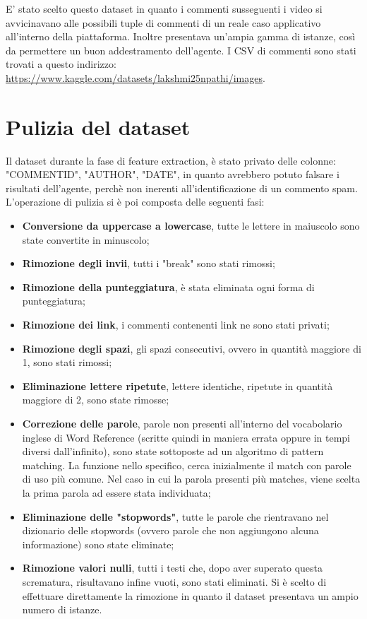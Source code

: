 \documentclass{report}
\begin{document}
    E' stato scelto questo dataset in quanto i commenti susseguenti i video si avvicinavano alle possibili tuple di commenti
    di un reale caso applicativo all'interno della piattaforma.
    Inoltre presentava un'ampia gamma di istanze, così da permettere un buon addestramento dell'agente.
    I CSV di commenti sono stati trovati a questo indirizzo: \newline 
    \href{https://www.kaggle.com/datasets/lakshmi25npathi/images}{https://www.kaggle.com/datasets/lakshmi25npathi/images}.
    
    \section{Pulizia del dataset}
    Il dataset durante la fase di feature extraction, 
    è stato privato delle colonne: "COMMENT\textunderscore ID", "AUTHOR", "DATE", in quanto avrebbero potuto falsare i risultati dell'agente, 
    perchè non inerenti all'identificazione di un commento spam.
    L'operazione di pulizia si è poi composta delle seguenti fasi: 

    \begin{itemize}
        \item {\bfseries Conversione da uppercase a lowercase}, tutte le lettere in maiuscolo sono state convertite in minuscolo;
        \item {\bfseries Rimozione degli invii}, tutti i "break" sono stati rimossi;
        \item {\bfseries Rimozione della punteggiatura}, è stata eliminata ogni forma di punteggiatura;
        \item {\bfseries Rimozione dei link}, i commenti contenenti link ne sono stati privati;
        \item {\bfseries Rimozione degli spazi}, gli spazi consecutivi, ovvero in  quantità maggiore di 1, sono stati rimossi;
        \item {\bfseries Eliminazione lettere ripetute}, lettere identiche, ripetute in quantità maggiore di 2, sono state rimosse;
        \item {\bfseries Correzione delle parole}, parole non presenti all'interno del vocabolario inglese di Word Reference (scritte quindi in maniera errata oppure in tempi diversi dall'infinito), sono state sottoposte 
        ad un algoritmo di pattern matching. La funzione nello specifico, cerca inizialmente il match con parole di uso più comune. Nel caso in cui
        la parola presenti più matches, viene scelta la prima parola ad essere stata individuata;
        \item {\bfseries Eliminazione delle "stopwords"}, tutte le parole che rientravano nel dizionario delle stopwords (ovvero parole che non aggiungono alcuna informazione) 
        sono state eliminate;
        \item {\bfseries Rimozione valori nulli}, tutti i testi che, dopo aver superato questa scrematura, risultavano infine vuoti, sono stati eliminati. Si è scelto di effettuare direttamente la rimozione in quanto il dataset presentava un ampio numero di istanze.

 
    \end{itemize}
    \newpage
    
\end{document}

